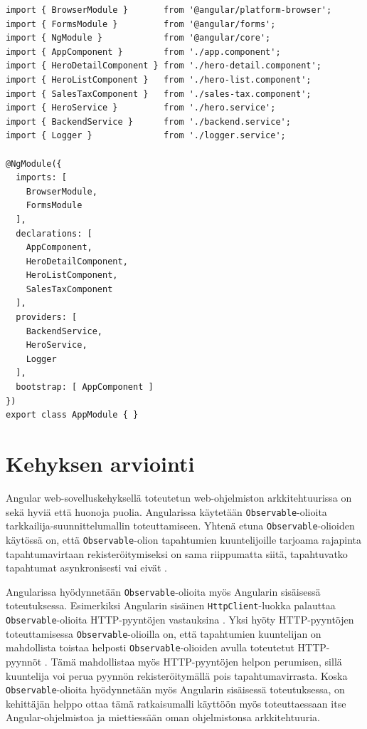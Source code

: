 \documentclass[finnish]{tktltiki2}
\theoremstyle{definition}
\theoremstyle{remark}
\numberwithin{figure}{section}
\begin{document}
\newpage


\begin{lstlisting}[style=htmlcssjs, caption=AppModule-moduuli \protect\cite{ExampleApplication}, label=lst:AppModule ]
import { BrowserModule }       from '@angular/platform-browser';
import { FormsModule }         from '@angular/forms';
import { NgModule }     	   from '@angular/core';
import { AppComponent } 	   from './app.component';
import { HeroDetailComponent } from './hero-detail.component';
import { HeroListComponent }   from './hero-list.component';
import { SalesTaxComponent }   from './sales-tax.component';
import { HeroService }         from './hero.service';
import { BackendService }      from './backend.service';
import { Logger }              from './logger.service';

@NgModule({
  imports: [
    BrowserModule,
    FormsModule
  ],
  declarations: [
    AppComponent,
    HeroDetailComponent,
    HeroListComponent,
    SalesTaxComponent
  ],
  providers: [
    BackendService,
    HeroService,
    Logger
  ],
  bootstrap: [ AppComponent ]
})
export class AppModule { }

\end{lstlisting}

\newpage

\section{Kehyksen arviointi}

Angular web-sovelluskehyksellä toteutetun web-ohjelmiston arkkitehtuurissa on sekä hyviä että huonoja puolia. Angularissa käytetään \texttt{Observable}-olioita tarkkailija-suunnittelumallin toteuttamiseen. Yhtenä etuna \texttt{Observable}-olioiden käytössä on, että \texttt{Observable}-olion tapahtumien kuuntelijoille tarjoama rajapinta tapahtumavirtaan rekisteröitymiseksi on sama riippumatta siitä, tapahtuvatko tapahtumat asynkronisesti vai eivät \cite{Observables}. 

Angularissa hyödynnetään \texttt{Observable}-olioita myös Angularin sisäisessä toteutuksessa. Esimerkiksi Angularin sisäinen \texttt{HttpClient}-luokka palauttaa \texttt{Observable}-olioita HTTP-pyyntöjen vastauksina \cite{HttpClient}. Yksi hyöty HTTP-pyyntöjen toteuttamisessa \texttt{Observable}-olioilla on, että tapahtumien kuuntelijan on mahdollista toistaa helposti \texttt{Observable}-olioiden avulla toteutetut HTTP-pyynnöt \cite{ObservablesInAngular}. Tämä mahdollistaa myös HTTP-pyyntöjen helpon perumisen, sillä kuuntelija voi perua pyynnön rekisteröitymällä pois tapahtumavirrasta. Koska \texttt{Observable}-olioita hyödynnetään myös Angularin sisäisessä toteutuksessa, on kehittäjän helppo ottaa tämä ratkaisumalli käyttöön myös toteuttaessaan itse Angular-ohjelmistoa ja miettiessään oman ohjelmistonsa arkkitehtuuria. 
\end{document}
